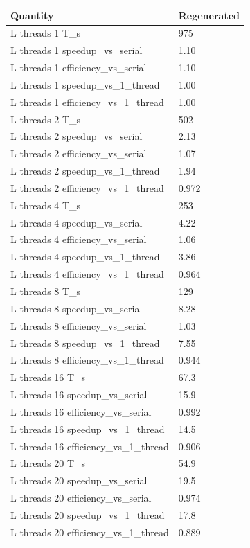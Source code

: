 \begin{tabular}{ll}
Quantity & Regenerated \\
\hline
L threads 1 T\_s & 975 \\
L threads 1 speedup\_vs\_serial & 1.10 \\
L threads 1 efficiency\_vs\_serial & 1.10 \\
L threads 1 speedup\_vs\_1\_thread & 1.00 \\
L threads 1 efficiency\_vs\_1\_thread & 1.00 \\
L threads 2 T\_s & 502 \\
L threads 2 speedup\_vs\_serial & 2.13 \\
L threads 2 efficiency\_vs\_serial & 1.07 \\
L threads 2 speedup\_vs\_1\_thread & 1.94 \\
L threads 2 efficiency\_vs\_1\_thread & 0.972 \\
L threads 4 T\_s & 253 \\
L threads 4 speedup\_vs\_serial & 4.22 \\
L threads 4 efficiency\_vs\_serial & 1.06 \\
L threads 4 speedup\_vs\_1\_thread & 3.86 \\
L threads 4 efficiency\_vs\_1\_thread & 0.964 \\
L threads 8 T\_s & 129 \\
L threads 8 speedup\_vs\_serial & 8.28 \\
L threads 8 efficiency\_vs\_serial & 1.03 \\
L threads 8 speedup\_vs\_1\_thread & 7.55 \\
L threads 8 efficiency\_vs\_1\_thread & 0.944 \\
L threads 16 T\_s & 67.3 \\
L threads 16 speedup\_vs\_serial & 15.9 \\
L threads 16 efficiency\_vs\_serial & 0.992 \\
L threads 16 speedup\_vs\_1\_thread & 14.5 \\
L threads 16 efficiency\_vs\_1\_thread & 0.906 \\
L threads 20 T\_s & 54.9 \\
L threads 20 speedup\_vs\_serial & 19.5 \\
L threads 20 efficiency\_vs\_serial & 0.974 \\
L threads 20 speedup\_vs\_1\_thread & 17.8 \\
L threads 20 efficiency\_vs\_1\_thread & 0.889 \\

\end{tabular}
